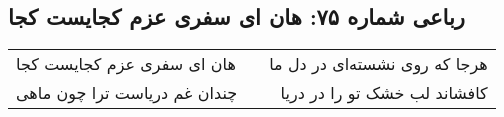 \begin{center}
\section*{رباعی شماره ۷۵: هان ای سفری عزم کجایست کجا}
\label{sec:0075}
\begin{longtable}{l p{0.5cm} r}
هان ای سفری عزم کجایست کجا
&&
هرجا که روی نشسته‌ای در دل ما
\\
چندان غم دریاست ترا چون ماهی
&&
کافشاند لب خشک تو را در دریا
\\
\end{longtable}
\end{center}
